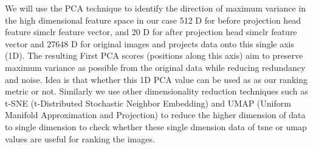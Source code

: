 We will use the PCA technique to identify the direction of maximum variance in the high dimensional feature space in our case 512 D for before projection head feature simclr feature vector, and 20 D for after projection head simclr feature vector and 27648 D for original images and projects data onto this single axis (1D). The resulting First PCA scores (positions along this axis) aim to preserve maximum variance as possible from the original data while reducing redundancy and noise.  Idea is that whether this 1D PCA value can be used as as our ranking metric or not. Similarly we use other dimensionality reduction techniques such as  t-SNE (t-Distributed Stochastic Neighbor Embedding)  and UMAP (Uniform Manifold Approximation and Projection) to reduce the higher dimension of data to single dimension to check whether these single dmension data of tsne or umap values are useful for ranking  the images. 
\begin{table}[H]
  \centering
  \caption{Comparison of dimensionality reduction techniques (PCA, UMAP, t-SNE) for various metrics before and after the projection head.}
  \label{tab:combined_dr}
  \end{table}

